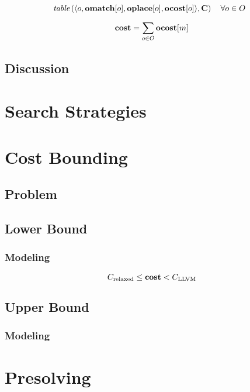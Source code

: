 \begin{equation}
  \hspace*{-2mm} %
  \mTable\left(
    \langle
      o,
      \mVar{omatch}[o],
      \mVar{oplace}[o],
      \mVar{ocost}[o]
    \rangle,
    \mCostMatrix
  \right)
  \mQuantSep
  \forall o \in \mOpSet
  \labelEquation{omatch-oplace-ocost-connection}
\end{equation}

\begin{equation}
  \mVar{cost} = \sum_{o \in \mOpSet} \mVar{ocost}[m]
  \labelEquation{total-cost}
\end{equation}

\subsection{Discussion}

\section{Search Strategies}

\section{Cost Bounding}
\subsection{Problem}
\subsection{Lower Bound}
\subsubsection{Modeling}

\begin{equation}
  \mRelaxedCost \leq \mVar{cost} < \mLlvmCost
  \labelEquation{bounds}
\end{equation}

\subsection{Upper Bound}
\subsubsection{Modeling}

\section{Presolving}
